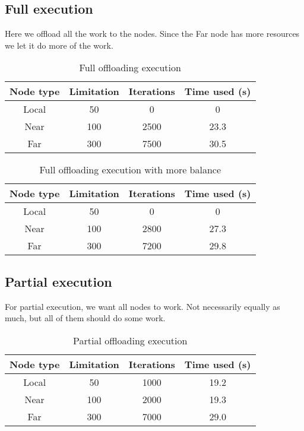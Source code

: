 \subsection{Full execution}
Here we offload all the work to the nodes. Since the Far node has more resources we let it do more of the work.
\begin{table}[h!]
    \centering
    \begin{tabular}[c]{|c|c|c|c|}
        \hline
        Node type & Limitation & Iterations & Time used (s)\\
        \hline
        \hline
        Local & 50 & 0 & 0 \\
        \hline
        Near & 100 & 2500 & 23.3 \\
        \hline
        Far & 300 & 7500 & 30.5 \\
        \hline
    \end{tabular}
    \caption{Full offloading execution}
    \label{tab:MEC_full_execution}
\end{table}


\begin{table}[h!]
    \centering
    \begin{tabular}[c]{|c|c|c|c|}
        \hline
        Node type & Limitation & Iterations & Time used (s)\\
        \hline
        \hline
        Local & 50 & 0 & 0 \\
        \hline
        Near & 100 & 2800 & 27.3 \\
        \hline
        Far & 300 & 7200 & 29.8 \\
        \hline
    \end{tabular}
    \caption{Full offloading execution with more balance}
    \label{tab:MEC_full_execution}
\end{table}





\subsection{Partial execution}
For partial execution, we want all nodes to work. Not necessarily equally as much, but all of them should do some work. 
\begin{table}[h!]
    \centering
    \begin{tabular}[c]{|c|c|c|c|}
        \hline
        Node type & Limitation & Iterations & Time used (s)\\
        \hline
        \hline
        Local & 50 & 1000 & 19.2 \\
        \hline
        Near & 100 & 2000 & 19.3 \\
        \hline
        Far & 300 & 7000 & 29.0 \\
        \hline
    \end{tabular}
    \caption{Partial offloading execution}
    \label{tab:MEC_partial_execution1}
\end{table}


